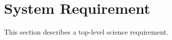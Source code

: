\section{System Requirement
\label{chap:sys_req}}

This section describes a top-level science requirement. 
